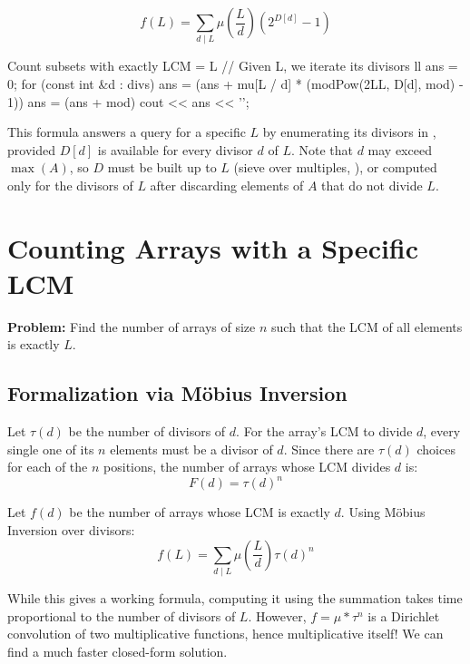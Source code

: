 \documentclass[11pt]{article}
\newcommand{\complexity}[1]{%
  \tcbox[on line, 
    colback=complbg, 
    colframe=compltext!50, 
    boxrule=0.5pt, 
    arc=2pt, 
    boxsep=0pt, 
    left=3pt, right=3pt, top=2pt, bottom=2pt
  ]{\color{compltext}\small\ensuremath{#1}}%
}
\begin{document}
\begin{resultbox}
    \begin{equation}
        f(L) = \sum_{d \mid L} \mu\left(\frac{L}{d}\right) \left( 2^{D[d]} - 1 \right)
    \end{equation}
\end{resultbox}

\begin{vscode}{Count subsets with exactly LCM = L}
// Given L, we iterate its divisors
ll ans = 0;
for (const int &d : divs)
    ans = (ans + mu[L / d] * (modPow(2LL, D[d], mod) - 1)) %
ans = (ans + mod) %
cout << ans << '\n';
\end{vscode}

This formula answers a query for a specific $L$ by enumerating its divisors in
\complexity{O(\sqrt{L})}, provided $D[d]$ is available for every divisor $d$ of $L$.
Note that $d$ may exceed $\max(A)$, so $D$ must be built up to $L$ (sieve over multiples,
\complexity{O(L \log L)}), or computed only for the divisors of $L$ after discarding elements of $A$
that do not divide $L$.

\pagebreak
\section{Counting Arrays with a Specific LCM}
\label{sec:arrays_lcm}

\textbf{Problem:} Find the number of arrays of size $n$ such that the LCM of all elements is exactly $L$.

\subsection{Formalization via Möbius Inversion}

\begin{derivation}
    Let $\tau(d)$ be the number of divisors of $d$.
    For the array's LCM to divide $d$, every single one of its $n$ elements must be a divisor of $d$.
    Since there are $\tau(d)$ choices for each of the $n$ positions, the number of arrays whose LCM divides $d$ is:
    \[ F(d) = \tau(d)^n \]

    Let $f(d)$ be the number of arrays whose LCM is exactly $d$. Using Möbius Inversion over divisors:
    \[ f(L) = \sum_{d \mid L} \mu\left(\frac{L}{d}\right) \tau(d)^n \]
\end{derivation}

While this gives a working formula, computing it using the summation takes time proportional to the number of divisors of $L$. However, $f = \mu * \tau^n$ is a Dirichlet convolution of two multiplicative functions, hence multiplicative itself! We can find a much faster closed-form solution.
\end{document}
